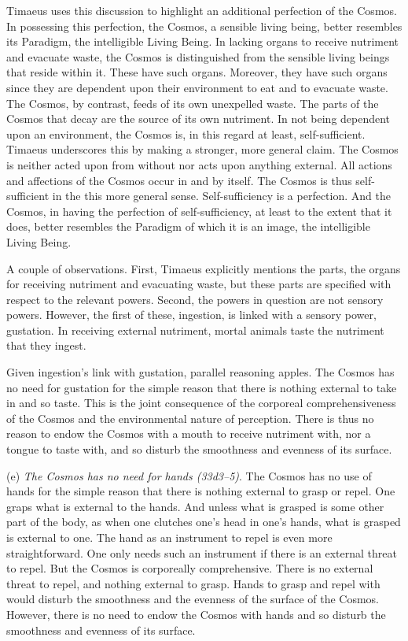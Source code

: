 Timaeus uses this discussion to highlight an additional perfection of the Cosmos. In possessing this perfection, the Cosmos, a sensible living being, better resembles its Paradigm, the intelligible Living Being. In lacking organs to receive nutriment and evacuate waste, the Cosmos is distinguished from the sensible living beings that reside within it. These have such organs. Moreover, they have such organs since they are dependent upon their environment to eat and to evacuate waste. The Cosmos, by contrast, feeds of its own unexpelled waste. The parts of the Cosmos that decay are the source of its own nutriment. In not being dependent upon an environment, the Cosmos is, in this regard at least, self-sufficient. Timaeus underscores this by making a stronger, more general claim. The Cosmos is neither acted upon from without nor acts upon anything external. All actions and affections of the Cosmos occur in and by itself. The Cosmos is thus self-sufficient in the this more general sense. Self-sufficiency is a perfection. And the Cosmos, in having the perfection of self-sufficiency, at least to the extent that it does, better resembles the Paradigm of which it is an image, the intelligible Living Being.

A couple of observations. First, Timaeus explicitly mentions the parts, the organs for receiving nutriment and evacuating waste, but these parts are specified with respect to the relevant powers. Second, the powers in question are not sensory powers. However, the first of these, ingestion, is linked with a sensory power, gustation. In receiving external nutriment, mortal animals taste the nutriment that they ingest. 

Given ingestion's link with gustation, parallel reasoning apples. The Cosmos has no need for gustation for the simple reason that there is nothing external to take in and so taste. This is the joint consequence of the corporeal comprehensiveness of the Cosmos and the environmental nature of perception. There is thus no reason to endow the Cosmos with a mouth to receive nutriment with, nor a tongue to taste with, and so disturb the smoothness and evenness of its surface.

(e) \emph{The Cosmos has no need for hands (33d3--5)}. The Cosmos has no use of hands for the simple reason that there is nothing external to grasp or repel. One graps what is external to the hands. And unless what is grasped is some other part of the body, as when one clutches one's head in one's hands, what is grasped is external to one. The hand as an instrument to repel is even more straightforward. One only needs such an instrument if there is an external threat to repel. But the Cosmos is corporeally comprehensive. There is no external threat to repel, and nothing external to grasp. Hands to grasp and repel with would disturb the smoothness and the evenness of the surface of the Cosmos. However, there is no need to endow the Cosmos with hands and so disturb the smoothness and evenness of its surface.

